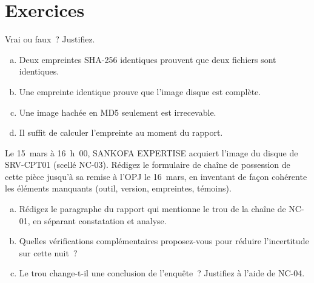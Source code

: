 \section*{Exercices}

\begin{boxexo}[title={\ding{45}\quad Exercice~2.1. Ce que dit l'empreinte \niveaubase}]
Vrai ou faux~? Justifiez.
\begin{enumerate}[(a)]
    \item Deux empreintes SHA-256 identiques prouvent que deux fichiers sont
          identiques.
    \item Une empreinte identique prouve que l'image disque est complète.
    \item Une image hachée en MD5 seulement est irrecevable.
    \item Il suffit de calculer l'empreinte au moment du rapport.
\end{enumerate}
\end{boxexo}

\begin{boxexo}[title={\ding{45}\quad Exercice~2.2. Remplir le formulaire \niveaumoyen}]
Le 15~mars à 16~h~00, SANKOFA EXPERTISE acquiert l'image du disque de
SRV-CPT01 (scellé NC-03). Rédigez le formulaire de chaîne de possession de
cette pièce jusqu'à sa remise à l'OPJ le 16~mars, en inventant de façon
cohérente les éléments manquants (outil, version, empreintes, témoins).
\end{boxexo}

\begin{boxexo}[title={\ding{45}\quad Exercice~2.3. La nuit du 14 au 15 \niveaumoyen}]
\begin{enumerate}[(a)]
    \item Rédigez le paragraphe du rapport qui mentionne le trou de la
          chaîne de NC-01, en séparant constatation et analyse.
    \item Quelles vérifications complémentaires proposez-vous pour réduire
          l'incertitude sur cette nuit~?
    \item Le trou change-t-il une conclusion de l'enquête~? Justifiez à
          l'aide de NC-04.
\end{enumerate}
\end{boxexo}

